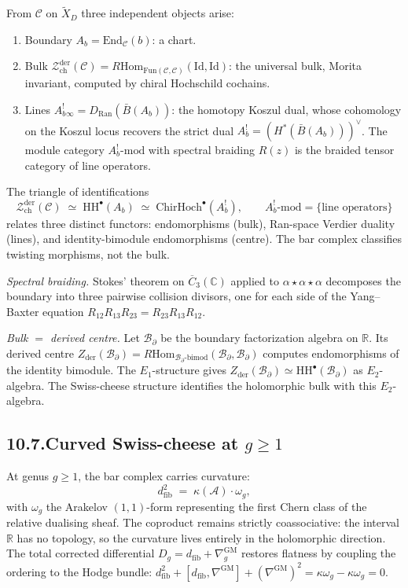 \documentclass[11pt,reqno]{amsart}
\theoremstyle{definition}
\theoremstyle{remark}
\providecommand{\cA}{\mathcal{A}}
\providecommand{\cB}{\mathcal{B}}
\providecommand{\cC}{\mathcal{C}}
\providecommand{\cZ}{\mathcal{Z}}
\providecommand{\barB}{\bar{B}}
\providecommand{\Ran}{\mathrm{Ran}}
\providecommand{\Hom}{\mathrm{Hom}}
\providecommand{\FM}{\overline{C}}
\providecommand{\bC}{\mathbb{C}}
\providecommand{\bR}{\mathbb{R}}
\providecommand{\HH}{\mathrm{HH}}
\providecommand{\Fun}{\mathrm{Fun}}
\providecommand{\End}{\mathrm{End}}
\providecommand{\der}{\mathrm{der}}
\providecommand{\ch}{\mathrm{ch}}
\providecommand{\Id}{\mathrm{Id}}
\providecommand{\GM}{\mathrm{GM}}
\numberwithin{equation}{section}
\begin{document}
From $\cC$ on $\widetilde X_D$ three independent objects arise:
\begin{enumerate}[label=\textup{(\roman*)},nosep]
\item Boundary $A_b = \End_\cC(b)$: a chart.
\item Bulk $\cZ^{\der}_{\ch}(\cC) =
R\Hom_{\Fun(\cC,\cC)}(\Id, \Id)$: the universal bulk, Morita
invariant, computed by chiral Hochschild cochains.
\item Lines
$A_b^!{}_\infty = D_{\Ran}(\barB(A_b))$: the homotopy Koszul
dual, whose cohomology on the Koszul locus recovers the strict
dual $A_b^! = (H^*(\barB(A_b)))^\vee$. The module category
$A_b^!\text{-mod}$ with spectral braiding $R(z)$ is the
braided tensor category of line operators.
\end{enumerate}
The triangle of identifications
\[
\cZ^{\der}_{\ch}(\cC)
\;\simeq\;
\HH^\bullet(A_b)
\;\simeq\;
\mathrm{ChirHoch}^\bullet(A_b^!),
\qquad
A_b^!\text{-mod} = \{\text{line operators}\}
\]
relates three distinct functors: endomorphisms (bulk),
Ran-space Verdier duality (lines), and identity-bimodule
endomorphisms (centre). The bar complex classifies twisting
morphisms, not the bulk.

\medskip\noindent\emph{Spectral braiding.} Stokes' theorem on
$\FM_3(\bC)$ applied to $\alpha\star\alpha\star\alpha$ decomposes
the boundary into three pairwise collision divisors, one for
each side of the Yang--Baxter equation
$R_{12}R_{13}R_{23} = R_{23}R_{13}R_{12}$.

\medskip\noindent\emph{Bulk $=$ derived centre.} Let
$\cB_\partial$ be the boundary factorization algebra on $\bR$.
Its derived centre
$Z_{\der}(\cB_\partial) = R\Hom_{\cB_\partial\text{-bimod}}
(\cB_\partial, \cB_\partial)$
computes endomorphisms of the identity bimodule. The
$E_1$-structure gives
$Z_{\der}(\cB_\partial) \simeq \HH^\bullet(\cB_\partial)$ as
$E_2$-algebra. The Swiss-cheese structure identifies the
holomorphic bulk with this $E_2$-algebra.

\subsection*{10.7.\enspace Curved Swiss-cheese at $g \ge 1$}

At genus $g \ge 1$, the bar complex carries curvature:
\[
d_{\mathrm{fib}}^2 \;=\; \kappa(\cA)\cdot\omega_g,
\]
with $\omega_g$ the Arakelov $(1,1)$-form representing the first
Chern class of the relative dualising sheaf. The coproduct
remains strictly coassociative: the interval $\bR$ has no
topology, so the curvature lives entirely in the holomorphic
direction. The total corrected differential
$D_g = d_{\mathrm{fib}} + \nabla^{\GM}_g$ restores flatness by
coupling the ordering to the Hodge bundle:
$d_{\mathrm{fib}}^2 + [d_{\mathrm{fib}}, \nabla^{\GM}]
+ (\nabla^{\GM})^2 = \kappa\omega_g - \kappa\omega_g = 0$.
\end{document}
